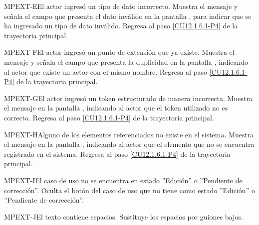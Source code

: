 	\begin{UCtrayectoriaA}{MPEXT-E}{El actor ingresó un tipo de dato incorrecto.}
		\UCpaso[\UCsist] Muestra el mensaje  y señala el campo que presenta el dato inválido en la pantalla , para indicar que se ha ingresado un tipo de dato inválido.
		\UCpaso Regresa al paso \ref{CU12.1.6.1-P4} de la trayectoria principal.
	\end{UCtrayectoriaA}
	
	\begin{UCtrayectoriaA}{MPEXT-F}{El actor ingresó un punto de extensión que ya existe.}
		\UCpaso[\UCsist] Muestra el mensaje  y señala el campo que presenta la duplicidad en la pantalla , indicando al actor que existe un actor con el mismo nombre.
		\UCpaso Regresa al paso \ref{CU12.1.6.1-P4} de la trayectoria principal.
	\end{UCtrayectoriaA}

	\begin{UCtrayectoriaA}{MPEXT-G}{El actor ingresó un token estructurado de manera incorrecta.}
		\UCpaso[\UCsist] Muestra el mensaje  en la pantalla , indicando al actor que el token utilizado no es correcto.
		\UCpaso Regresa al paso \ref{CU12.1.6.1-P4} de la trayectoria principal.
	\end{UCtrayectoriaA}
	
	\begin{UCtrayectoriaA}{MPEXT-H}{Alguno de los elementos referenciados no existe en el sistema.}
		\UCpaso[\UCsist] Muestra el mensaje  en la pantalla , indicando al actor que el elemento que no se encuentra registrado en el sistema.
		\UCpaso Regresa al paso \ref{CU12.1.6.1-P4} de la trayectoria principal.
	\end{UCtrayectoriaA}

	\begin{UCtrayectoriaA}{MPEXT-I}{El caso de uso no se encuentra en estado ''Edición'' o ''Pendiente de corrección''.}
		\UCpaso[\UCsist] Oculta el botón  del caso de uso que no tiene como estado ''Edición'' o ''Pendiente de corrección''.
	\end{UCtrayectoriaA}

	\begin{UCtrayectoriaA}{MPEXT-J}{El texto contiene espacios.}
		\UCpaso[\UCsist] Sustituye los espacios por guiones bajos.
	\end{UCtrayectoriaA}
